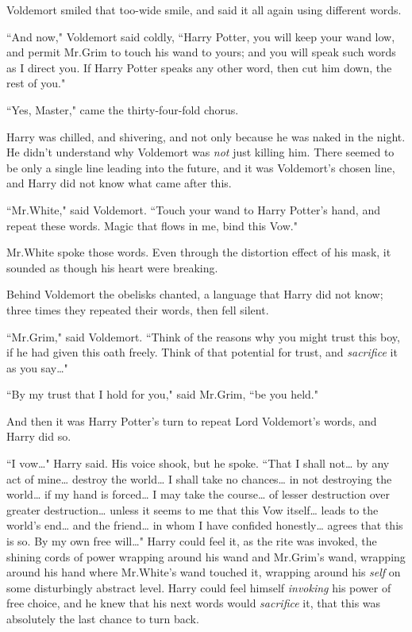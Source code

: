 Voldemort smiled that too-wide smile, and said it all again using different words.

``And now," Voldemort said coldly, ``Harry Potter, you will keep your wand low, and permit Mr.\?Grim to touch his wand to yours; and you will speak such words as I direct you. If Harry Potter speaks any other word, then cut him down, the rest of you."

``Yes, Master," came the thirty-four-fold chorus.

Harry was chilled, and shivering, and not only because he was naked in the night. He didn't understand why Voldemort was \emph{not} just killing him. There seemed to be only a single line leading into the future, and it was Voldemort's chosen line, and Harry did not know what came after this.

``Mr.\?White," said Voldemort. ``Touch your wand to Harry Potter's hand, and repeat these words. Magic that flows in me, bind this Vow."

Mr.\?White spoke those words. Even through the distortion effect of his mask, it sounded as though his heart were breaking.

Behind Voldemort the obelisks chanted, a language that Harry did not know; three times they repeated their words, then fell silent.

``Mr.\?Grim," said Voldemort. ``Think of the reasons why you might trust this boy, if he had given this oath freely. Think of that potential for trust, and \emph{sacrifice} it as you say{\ldots}"

``By my trust that I hold for you," said Mr.\?Grim, ``be you held."

And then it was Harry Potter's turn to repeat Lord Voldemort's words, and Harry did so.

``I vow{\ldots}" Harry said. His voice shook, but he spoke. ``That I shall not{\ldots} by any act of mine{\ldots} destroy the world{\ldots} I shall take no chances{\ldots} in not destroying the world{\ldots} if my hand is forced{\ldots} I may take the course{\ldots} of lesser destruction over greater destruction{\ldots} unless it seems to me that this Vow itself{\ldots} leads to the world's end{\ldots} and the friend{\ldots} in whom I have confided honestly{\ldots} agrees that this is so. By my own free will{\ldots}" Harry could feel it, as the rite was invoked, the shining cords of power wrapping around his wand and Mr.\?Grim's wand, wrapping around his hand where Mr.\?White's wand touched it, wrapping around his \emph{self} on some disturbingly abstract level. Harry could feel himself \emph{invoking} his power of free choice, and he knew that his next words would \emph{sacrifice} it, that this was absolutely the last chance to turn back.

